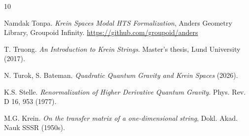 \documentclass{article}
\begin{document}

\begin{thebibliography}{10}

 Namdak Tonpa. \textit{Krein Spaces Modal HTS Formalization}, Anders Geometry Library, Groupoid Infinity. \url{https://github.com/groupoid/anders}

 T. Truong. \textit{An Introduction to Krein Strings}. Master's thesis, Lund University (2017).

 N. Turok, S. Bateman. \textit{Quadratic Quantum Gravity and Krein Spaces} (2026).

 K.S. Stelle. \textit{Renormalization of Higher Derivative Quantum Gravity}. Phys. Rev. D 16, 953 (1977).

 M.G. Krein. \textit{On the transfer matrix of a one-dimensional string}, Dokl. Akad. Nauk SSSR (1950s).

\end{thebibliography}
\end{document}
